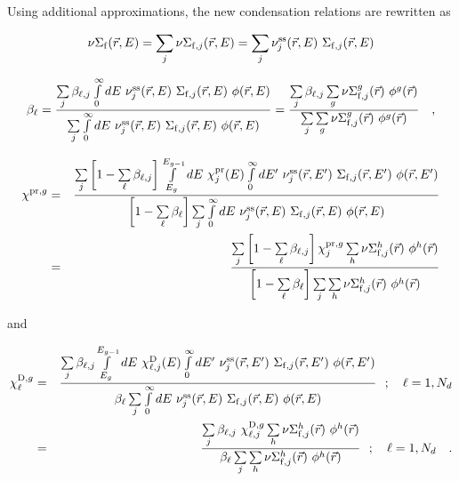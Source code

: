 \vskip 0.2cm

Using additional approximations, the new condensation relations are rewritten as

\begin{equation}
\nu\Sigma_{\rm f}(\vec r,E)=\sum_j \nu\Sigma_{{\rm f},j}(\vec r,E)=\sum_j \nu_j^{\rm ss}(\vec r,E) \ \Sigma_{{\rm f},j}(\vec r,E)
\end{equation}

\begin{equation}
\beta_\ell={\sum\limits_j{\beta_{\ell,j}\int\limits_0^\infty dE \ \nu_j^{\rm ss}(\vec r,E) \ \Sigma_{{\rm f},j}(\vec r,E) \
\phi(\vec r,E)} \over \sum\limits_j{\int\limits_0^\infty dE \ \nu_j^{\rm ss}(\vec r,E) \ \Sigma_{{\rm f},j}(\vec r,E) \
\phi(\vec r,E)} } = {\sum\limits_j{\beta_{\ell,j}\sum\limits_g \nu\Sigma_{{\rm
f},j}^g(\vec r) \ \phi^g(\vec r)} \over \sum\limits_j{\sum\limits_g
\nu\Sigma_{{\rm f},j}^g(\vec r) \ \phi^g(\vec r)} } \ \ \ ,
\end{equation}

\vskip 0.2cm

\begin{eqnarray}
\nonumber \chi^{{\rm pr},g}&=&{\sum\limits_j\left[1-\sum\limits_\ell\beta_{\ell,j}\right]{\int\limits_{E_g}^{E_{g-1}}
dE \ \chi_j^{\rm pr}(E) \int\limits_0^\infty dE' \ \nu_j^{\rm ss}(\vec r,E') \ \Sigma_{{\rm f},j}(\vec r,E')
\ \phi(\vec r,E')} \over \left[1-\sum\limits_\ell\beta_\ell\right] \sum\limits_j{\int\limits_0^\infty dE
\ \nu_j^{\rm ss}(\vec r,E) \ \Sigma_{{\rm f},j}(\vec r,E) \ \phi(\vec r,E)}} \\
 &=& {\sum\limits_j\left[1-\sum\limits_\ell\beta_{\ell,j}\right]{
\chi_j^{{\rm pr},g} \sum\limits_h \nu\Sigma_{{\rm f},j}^h(\vec r)
\ \phi^h(\vec r)} \over \left[1-\sum\limits_\ell\beta_\ell\right] \sum\limits_j{
\sum\limits_h \nu\Sigma_{{\rm f},j}^h(\vec r) \ \phi^h(\vec r)}}
\end{eqnarray}

\noindent and

\begin{eqnarray}
\nonumber \chi_\ell^{{\rm D},g}&=&{\sum\limits_j \beta_{\ell,j}{\int\limits_{E_g}^{E_{g-1}} dE \ \chi_{\ell,j}^{\rm D}(E)
\int\limits_0^\infty dE' \ \nu_j^{\rm ss}(\vec r,E') \ \Sigma_{{\rm f},j}(\vec r,E')
\ \phi(\vec r,E')} \over \beta_\ell \sum\limits_j{\int\limits_0^\infty dE \ \nu_j^{\rm ss}(\vec r,E)
\ \Sigma_{{\rm f},j}(\vec r,E) \ \phi(\vec r,E)}} \ \ ; \ \ \ \ell=1,N_d \\
&=&{\sum\limits_j \beta_{\ell,j} \ {\chi_{\ell,j}^{{\rm D},g}
\sum\limits_h \nu\Sigma_{{\rm f},j}^h(\vec r)
\ \phi^h(\vec r)} \over \beta_\ell \sum\limits_j{\sum\limits_h \nu\Sigma_{{\rm f},j}^h(\vec r)
\ \phi^h(\vec r)}} \ \ ; \ \ \ \ell=1,N_d \ \ \ .
\end{eqnarray}

